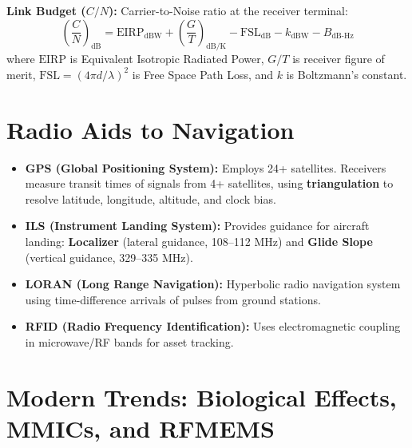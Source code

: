 \documentclass[12pt,a4paper]{article}
\begin{document}
\textbf{Link Budget ($C/N$):} Carrier-to-Noise ratio at the receiver terminal:
  \begin{equation}
    \left(\frac{C}{N}\right)_{\text{dB}} = \text{EIRP}_{\text{dBW}} + \left(\frac{G}{T}\right)_{\text{dB/K}} - \text{FSL}_{\text{dB}} - k_{\text{dBW}} - B_{\text{dB-Hz}}
  \end{equation}
  where $\text{EIRP}$ is Equivalent Isotropic Radiated Power, $G/T$ is receiver figure of merit, $\text{FSL} = (4\pi d/\lambda)^2$ is Free Space Path Loss, and $k$ is Boltzmann's constant.

\section{Radio Aids to Navigation}

\begin{itemize}[leftmargin=*, itemsep=3pt]
  \item \textbf{GPS (Global Positioning System):} Employs 24+ satellites. Receivers measure transit times of signals from 4+ satellites, using \textbf{triangulation} to resolve latitude, longitude, altitude, and clock bias.
  \item \textbf{ILS (Instrument Landing System):} Provides guidance for aircraft landing: \textbf{Localizer} (lateral guidance, 108--112 MHz) and \textbf{Glide Slope} (vertical guidance, 329--335 MHz).
  \item \textbf{LORAN (Long Range Navigation):} Hyperbolic radio navigation system using time-difference arrivals of pulses from ground stations.
  \item \textbf{RFID (Radio Frequency Identification):} Uses electromagnetic coupling in microwave/RF bands for asset tracking.
\end{itemize}

\section{Modern Trends: Biological Effects, MMICs, and RFMEMS}
\end{document}
